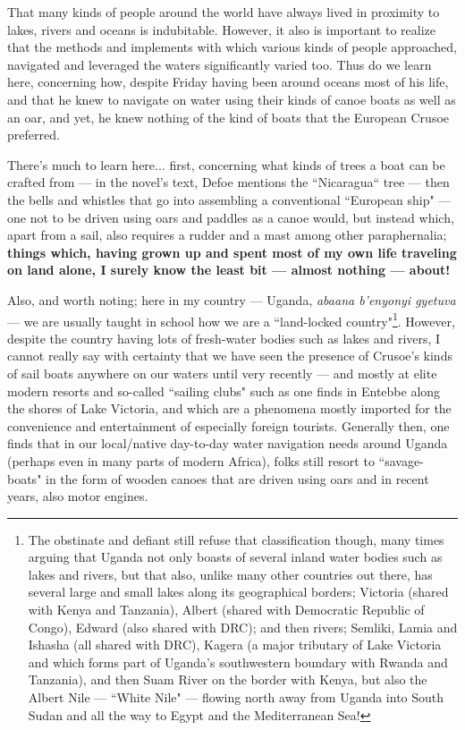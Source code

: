 \documentclass[a4paper]{article}
\begin{document}
That many kinds of people around the world have always lived in proximity to lakes, rivers and oceans is indubitable. However, it also is important to realize that the methods and implements with which various kinds of people approached, navigated and leveraged the waters significantly varied too. Thus do we learn here, concerning how, despite Friday having been around oceans most of his life, and that he knew to navigate on water using their kinds of canoe boats as well as an oar, and yet, he knew nothing of the kind of boats that the European Crusoe preferred.

There's much to learn here... first, concerning what kinds of trees a boat can be crafted from --- in the novel's text, Defoe mentions the ``Nicaragua`` tree --- then the bells and whistles that go into assembling a conventional ``European ship" --- one not to be driven using oars and paddles as a canoe would, but instead which, apart from a sail, also requires a rudder and a mast among other paraphernalia; \textbf{things which, having grown up and spent most of my own life traveling on land alone, I surely know the least bit --- almost nothing --- about!}


Also, and worth noting; here in my country --- Uganda, \textit{abaana b'enyonyi gyetuva} --- we are usually taught in school how we are a ``land-locked country"\footnote{The obstinate and defiant still refuse that classification though, many times arguing that Uganda not only boasts of several inland water bodies such as lakes and rivers, but that also, unlike many other countries out there, has several large and small lakes along its geographical borders; Victoria (shared with Kenya and Tanzania), Albert (shared with Democratic Republic of Congo), Edward (also shared with DRC); and then rivers; Semliki, Lamia and Ishasha (all shared with DRC), Kagera (a major tributary of Lake Victoria and which forms part of Uganda's southwestern boundary with Rwanda and Tanzania), and then Suam River on the border with Kenya, but also the Albert Nile --- ``White Nile" --- flowing north away from Uganda into South Sudan and all the way to Egypt and the Mediterranean Sea!}. However, despite the country having lots of fresh-water bodies such as lakes and rivers, I cannot really say with certainty that we have seen the presence of Crusoe's kinds of sail boats anywhere on our waters until very recently --- and mostly at elite modern resorts and so-called ``sailing clubs" such as one finds in Entebbe along the shores of Lake Victoria, and which are a phenomena mostly imported for the convenience and entertainment of especially foreign tourists. Generally then, one finds that in our local/native day-to-day water navigation needs around Uganda (perhaps even in many parts of modern Africa), folks still resort to ``savage-boats" in the form of wooden canoes that are driven using oars and in recent years, also motor engines.
\end{document}
